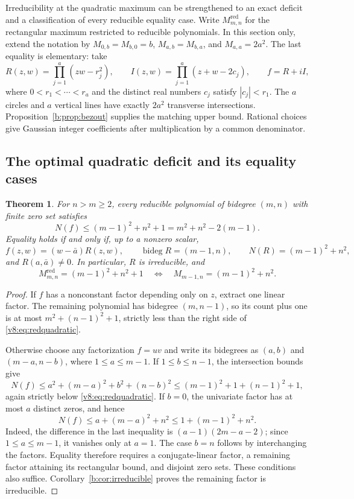 \documentclass[UTF8,11pt]{ctexart}
\newtheorem{thm}{Theorem}[section]
\theoremstyle{definition}
\numberwithin{equation}{section}
\begin{document}
Irreducibility at the quadratic maximum can be strengthened to an
exact deficit and a classification of every reducible equality case.
Write $M^{\mathrm{red}}_{m,n}$ for the rectangular maximum restricted
to reducible polynomials. In this section only, extend the notation by
$M_{0,b}=M_{b,0}=b$, $M_{a,b}=M_{b,a}$, and $M_{a,a}=2a^2$.
The last equality is elementary: take
\[
 R(z,w)=\prod_{j=1}^a(zw-r_j^2),\qquad
 I(z,w)=\prod_{j=1}^a(z+w-2c_j),\qquad f=R+iI,
\]
where $0<r_1<\cdots<r_a$ and the distinct real numbers $c_j$
satisfy $|c_j|<r_1$. The $a$ circles and $a$ vertical lines have
exactly $2a^2$ transverse intersections. Proposition~\ref{b:prop:bezout}
supplies the matching upper bound. Rational choices give Gaussian
integer coefficients after multiplication by a common denominator.

\subsection{The optimal quadratic deficit and its equality cases}

\begin{thm}\label{v8:thm:redquadratic}
For $n>m\ge2$, every reducible polynomial of bidegree $(m,n)$
with finite zero set satisfies
\begin{equation}\label{v8:eq:redquadratic}
 N(f)\le (m-1)^2+n^2+1=m^2+n^2-2(m-1).
\end{equation}
Equality holds if and only if, up to a nonzero scalar,
\[
 f(z,w)=(w-\bar a)R(z,w),\qquad
 \operatorname{bideg}R=(m-1,n),\qquad
 N(R)=(m-1)^2+n^2,
\]
and $R(a,\bar a)\ne0$. In particular, $R$ is irreducible, and
\begin{equation}\label{v8:eq:redcriterion}
 M^{\mathrm{red}}_{m,n}=(m-1)^2+n^2+1
 \quad\Longleftrightarrow\quad
 M_{m-1,n}=(m-1)^2+n^2.
\end{equation}
\end{thm}
\begin{proof}
If $f$ has a nonconstant factor depending only on $z$, extract one
linear factor. The remaining polynomial has bidegree $(m,n-1)$,
so its count plus one is at most $m^2+(n-1)^2+1$, strictly less
than the right side of \eqref{v8:eq:redquadratic}.

Otherwise choose any factorization $f=uv$ and write its bidegrees
as $(a,b)$ and $(m-a,n-b)$, where $1\le a\le m-1$.
If $1\le b\le n-1$, the intersection bounds give
\[
 N(f)\le a^2+(m-a)^2+b^2+(n-b)^2
 \le (m-1)^2+1+(n-1)^2+1,
\]
again strictly below \eqref{v8:eq:redquadratic}.
If $b=0$, the univariate factor has at most $a$ distinct zeros,
and hence
\[
 N(f)\le a+(m-a)^2+n^2\le1+(m-1)^2+n^2.
\]
Indeed, the difference in the last inequality is
$(a-1)(2m-a-2)$; since $1\le a\le m-1$, it vanishes only
at $a=1$. The case $b=n$ follows by interchanging the factors.
Equality therefore requires a conjugate-linear factor, a remaining
factor attaining its rectangular bound, and disjoint zero sets.
These conditions also suffice. Corollary~\ref{b:cor:irreducible}
proves the remaining factor is irreducible.
\end{proof}
\end{document}
